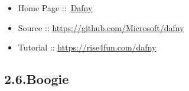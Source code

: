 \documentclass[12pt,twoside]{article}
\begin{document}
\begin{itemize}[noitemsep,topsep=\mdcompacttopsep]%

\item{}Home Page ::~\href{https://www.microsoft.com/en-us/research/project/dafny-a-language-and-program-verifier-for-functional-correctness}{Dafny}%

\item{}Source :: \href{https://github.com/Microsoft/dafny}{{\ttfamily https://\hspace{0pt}github.\hspace{0pt}com/\hspace{0pt}Microsoft/\hspace{0pt}dafny}}%

\item{}Tutorial :: \href{https://rise4fun.com/dafny}{{\ttfamily https://\hspace{0pt}rise4fun.\hspace{0pt}com/\hspace{0pt}dafny}}%
\end{itemize}%

\subsection{2.6.\hspace*{0.5em}Boogie}\label{sec-boogie}%
\end{document}
